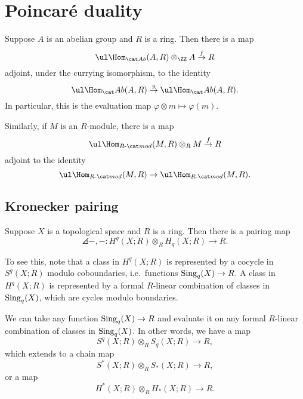 \documentclass{standalone}
\begin{document}
\section{Poincar\'e duality}
Suppose \(A\) is an abelian group and \(R\) is a ring.
Then there is a map
\[
  \ul\Hom_{\cAb}(A, R) \otimes_\ZZ A \overset{f}{\to} R
\]
adjoint, under the currying isomorphism, to the identity
\[
  \ul\Hom_\cAb(A, R) \overset{g}{\to}
  \ul\Hom_\cAb(A, R).
\]
In particular, this is the evaluation map
\(\varphi \otimes m \mapsto \varphi(m)\).

Similarly, if \(M\) is an \(R\)-module, there is a map
\[
  \ul\Hom_\cRmod(M, R) \otimes_R M \overset{f}{\to} R
\]
adjoint to the identity
\[
  \ul\Hom_\cRmod(M, R) \to \ul\Hom_\cRmod(M, R).
\]

\subsection{Kronecker pairing}
Suppose \(X\) is a topological space and \(R\) is a ring.
Then there is a pairing map
\[
  \angles{{-}, {-}} \colon H^q(X; R) \otimes_R H_q(X; R) \to R.
\]

To see this, note that a class in \(H^q(X; R)\) is represented by
a cocycle in \(S^q(X; R)\) modulo coboundaries,
i.e.\ functions \(\operatorname{Sing}_q(X) \to R\).
A class in \(H^q(X; R)\) is represented by
a formal \(R\)-linear combination of classes in \(\operatorname{Sing}_q(X)\),
which are cycles modulo boundaries.

We can take any function \(\operatorname{Sing}_q(X) \to R\) and evaluate it on
any formal \(R\)-linear combination of classes in \(\operatorname{Sing}_q(X)\).
In other words, we have a map
\[
  S^q(X; R) \otimes_R S_q(X; R) \to R,
\]
which extends to a chain map
\[
  S^*(X; R) \otimes_R S_*(X; R) \to R,
\]
or a map
\[
  H^*(X; R) \otimes_R H_*(X; R) \to R.
\]
\end{document}
